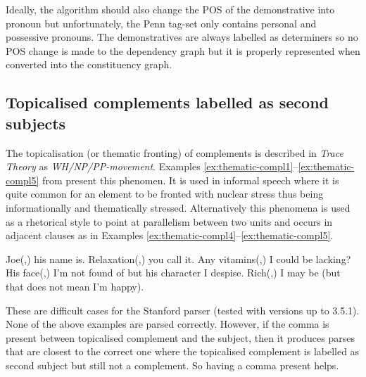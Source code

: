     Ideally, the algorithm should also change the POS of the demonstrative into pronoun but unfortunately, the Penn tag-set only contains personal and possessive pronouns. The demonstratives are always labelled as determiners so no POS change is made to the dependency graph but it is properly represented when converted into the constituency graph.

\subsection{Topicalised complements labelled as second subjects}   
    The topicalisation (or thematic fronting) of complements is described in \textit{Trace Theory} as \textit{WH/NP/PP-movement}. Examples \ref{ex:thematic-compl1}--\ref{ex:thematic-compl5} from \citet[pp.~412-413]{Quirk1985} present this phenomen. It is used in informal speech where it is quite common for an element to be fronted with nuclear stress thus being informationally and thematically stressed. Alternatively this phenomena is used as a rhetorical style to point at parallelism between two units and occurs in adjacent clauses as in Examples \ref{ex:thematic-compl4}--\ref{ex:thematic-compl5}.

    \begin{exe}
    \ex\label{ex:thematic-compl1} Joe(,) his name is. 
    \ex\label{ex:thematic-compl2} Relaxation(,) you call it. 
    \ex\label{ex:thematic-compl3.5} Any vitamins(,) I could be lacking? 
    \ex\label{ex:thematic-compl4} His face(,) I'm not found of but his character I despise.
    \ex\label{ex:thematic-compl5} Rich(,) I may be (but that does not mean I'm happy).
    \end{exe}

    These are difficult cases for the Stanford parser (tested with versions up to 3.5.1). None of the above examples are parsed correctly. However, if the comma is present between topicalised complement and the subject, then it produces parses that are closest to the correct one where the topicalised complement is labelled as second subject but still not a complement. So having a comma present helps. 

